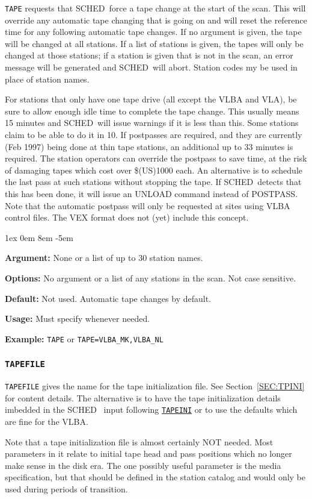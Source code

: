 \documentclass{report}
\newcommand{\schedb}{{\sc SCHED~}}
\newcommand{\rcwbox}[5]{
  \begin{list}{}{\parsep 1ex  \itemsep 0em
                 \leftmargin 8em  \itemindent -5em }
    \item {\bf Argument:} #1
    \item {\bf Options:}  #2
    \item {\bf Default:}  #3
    \item {\bf Usage:}    #4
    \item {\bf Example:}  #5
  \end{list}
}
\begin{document}
{\tt TAPE} requests that \schedb force a tape change at the start
of the scan.  This will override any automatic tape changing that is
going on and will reset the reference time for any following automatic
tape changes. If no argument is given, the tape will be changed at all
stations. If a list of stations is given, the tapes will only be
changed at those stations; if a station is given that is not in the
scan, an error message will be generated and \schedb will abort.
Station codes my be used in place of station names.

For stations that only have one tape drive (all except the VLBA and
VLA), be sure to allow enough idle time to complete the tape
change.  This usually means 15 minutes and \schedb will issue
warnings if it is less than this.  Some stations claim to be able
to do it in 10.  If postpasses are required, and they are currently
(Feb 1997) being done at thin tape stations, an additional up to
33 minutes is required.  The station operators can override the
postpass to save time, at the risk of damaging tapes which cost
over \$(US)1000 each.  An alternative is to schedule the last pass
at such stations without stopping the tape.  If \schedb detects
that this has been done, it will issue an UNLOAD command instead
of POSTPASS.  Note that the automatic postpass will only be
requested at sites using VLBA control files.  The VEX format does
not (yet) include this concept.

\rcwbox
{None or a list of up to 30 station names.}
{No argument or a list of any stations in the scan. Not case sensitive.}
{Not used. Automatic tape changes by default.}
{Must specify whenever needed.}
{{\tt TAPE} or {\tt TAPE=VLBA\_MK,VLBA\_NL}}


\subsubsection{\label{MP:TAPEFILE}{\tt TAPEFILE}}

{\tt TAPEFILE} gives the name for the tape initialization file. See
Section~\ref{SEC:TPINI} for content details.  The alternative is
to have the tape initialization details imbedded in the \schedb
input following 
{\hyperref[MP:TAPEINI]{{\tt TAPEINI}}} or to use the defaults
which are fine for the VLBA.

Note that a tape initialization file is almost certainly NOT needed.
Most parameters in it relate to initial tape head and pass positions
which no longer make sense in the disk era.  The one possibly useful
parameter is the media specification, but that should be defined in
the station catalog and would only be used during periods of transition.
\end{document}
